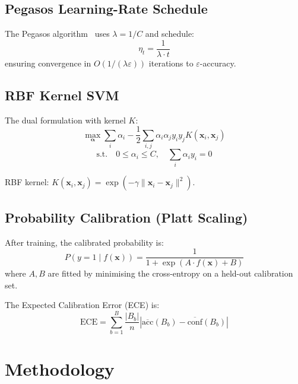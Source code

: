 \documentclass[conference]{IEEEtran}
\begin{document}
\subsection{Pegasos Learning-Rate Schedule}

The Pegasos algorithm~\cite{shalev2007} uses $\lambda = 1/C$ and schedule:
\begin{equation}
  \eta_t = \frac{1}{\lambda \cdot t}
\end{equation}
ensuring convergence in $O(1/(\lambda\varepsilon))$ iterations to $\varepsilon$-accuracy.

\subsection{RBF Kernel SVM}

The dual formulation with kernel $K$:
\begin{equation}
  \max_{\boldsymbol{\alpha}} \sum_i \alpha_i - \frac{1}{2}\sum_{i,j}
  \alpha_i\alpha_j y_i y_j K(\mathbf{x}_i,\mathbf{x}_j)
\end{equation}
\begin{equation}
  \text{s.t.}\quad 0 \leq \alpha_i \leq C,\quad \sum_i \alpha_i y_i = 0
\end{equation}

RBF kernel: $K(\mathbf{x}_i, \mathbf{x}_j) = \exp(-\gamma\|\mathbf{x}_i - \mathbf{x}_j\|^2)$.

\subsection{Probability Calibration (Platt Scaling)}

After training, the calibrated probability is:
\begin{equation}
  P(y{=}1 \mid f(\mathbf{x})) = \frac{1}{1 + \exp(A\cdot f(\mathbf{x}) + B)}
\end{equation}
where $A, B$ are fitted by minimising the cross-entropy on a held-out calibration set.

The Expected Calibration Error (ECE) is:
\begin{equation}
  \text{ECE} = \sum_{b=1}^B \frac{|B_b|}{n}
  \left|\overline{\text{acc}}(B_b) - \overline{\text{conf}}(B_b)\right|
\end{equation}

\section{Methodology}
\label{sec:methodology}
\end{document}
